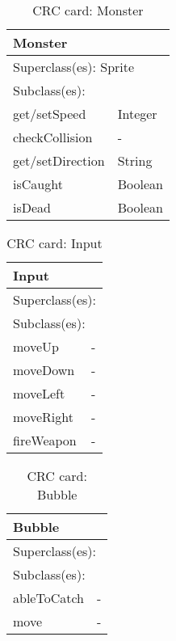 \begin{table}[h!]
\centering
\label{crc_monster}
\begin{tabular}{|l|l|}
\hline
\multicolumn{2}{|l|}{\textbf{Monster}} \\ \hline
\multicolumn{2}{|l|}{Superclass(es): Sprite} \\ \hline
\multicolumn{2}{|l|}{Subclass(es):} \\ \hline
get/setSpeed            & Integer \\ \hline
checkCollision          & -\\ \hline
get/setDirection        & String\\ \hline
isCaught                & Boolean \\ \hline
isDead                  & Boolean \\ \hline
\end{tabular}
\caption{CRC card: Monster}
\end{table}

\begin{table}[h!]
\centering
\label{crc_input}
\begin{tabular}{|l|l|}
\hline
\multicolumn{2}{|l|}{\textbf{Input}} \\ \hline
\multicolumn{2}{|l|}{Superclass(es):} \\ \hline
\multicolumn{2}{|l|}{Subclass(es):} \\ \hline
moveUp          & -\\ \hline
moveDown        & - \\ \hline
moveLeft        & -\\ \hline
moveRight       & -\\ \hline
fireWeapon      & - \\ \hline
\end{tabular}
\caption{CRC card: Input}
\end{table}

\begin{table}[h!]
\centering
\label{crc_bubble}
\begin{tabular}{|l|l|}
\hline
\multicolumn{2}{|l|}{\textbf{Bubble}} \\ \hline
\multicolumn{2}{|l|}{Superclass(es):} \\ \hline
\multicolumn{2}{|l|}{Subclass(es):} \\ \hline
ableToCatch           & - \\ \hline
move           & -\\ \hline
\end{tabular}
\caption{CRC card: Bubble}
\end{table}

